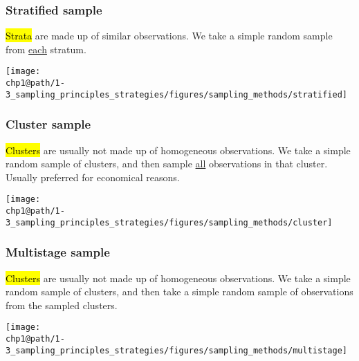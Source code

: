 \documentclass[slidestop,compress,mathserif]{beamer}
\makeatletter
\def\chp1@path{../../Chp 1}
\makeatother
\begin{document}

\begin{frame}
	\frametitle{Stratified sample}

	\hl{Strata} are made up of similar observations. We take a simple random sample from \underline{each} stratum.

	\begin{center}
	\texttt{[image: \\chp1@path/1-3\_sampling\_principles\_strategies/figures/sampling\_methods/stratified]}
	\end{center}

\end{frame}


\begin{frame}
	\frametitle{Cluster sample}

	\hl{Clusters} are usually not made up of homogeneous observations. We take a simple random sample of clusters, and then sample \underline{all} observations in that cluster. Usually preferred for economical reasons.

	\begin{center}
	\texttt{[image: \\chp1@path/1-3\_sampling\_principles\_strategies/figures/sampling\_methods/cluster]}
	\end{center}

\end{frame}


\begin{frame}
	\frametitle{Multistage sample}

	\hl{Clusters} are usually not made up of homogeneous observations.  We take a simple random sample of clusters, and then take a simple random sample of observations from the sampled clusters.

	\begin{center}
	\texttt{[image: \\chp1@path/1-3\_sampling\_principles\_strategies/figures/sampling\_methods/multistage]}
	\end{center}

\end{frame}


\end{document}
